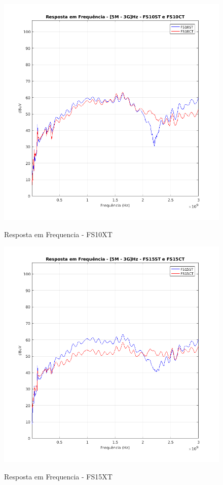 \begin{figure}[H]
	\centering 
	\caption{Resposta em Frequencia - FS10XT}
	\includegraphics[scale=0.7]{./img/FS10XT}
	\label{fig:FS10XT}
\end{figure}

\begin{figure}[H]
	\centering 
	\caption{Resposta em Frequencia - FS15XT}
	\includegraphics[scale=0.7]{./img/FS15XT}
	\label{fig:FS15XT}
\end{figure}

